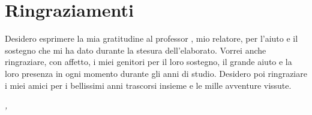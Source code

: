 \bigskip

\begingroup
\let\clearpage\relax
\let\cleardoublepage\relax
\let\cleardoublepage\relax

\chapter*{Ringraziamenti}
\noindent Desidero esprimere la mia gratitudine al professor \myProf, mio relatore, per l'aiuto e il sostegno che mi ha dato durante la stesura dell'elaborato.
\noindent Vorrei anche ringraziare, con affetto, i miei genitori per il loro sostegno, il grande aiuto e la loro presenza in ogni momento durante gli anni di studio.
\noindent Desidero poi ringraziare i miei amici per i bellissimi anni trascorsi insieme e le mille avventure vissute.
\bigskip

\noindent\textit{\myLocation, \myTime}
\hfill \myName

\endgroup
